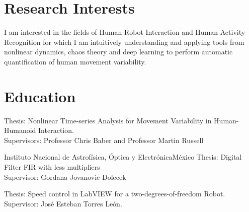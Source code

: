 \documentclass[10pt,a4paper,roman]{moderncv}
\begin{document}
\section{Research Interests}
\begin{changemargin}{2.4cm}{0.5cm}
I am interested in the fields of Human-Robot Interaction and Human Activity Recognition
for which I am intuitively understanding and applying tools from nonlinear dynamics, chaos theory 
and deep learning to perform automatic quantification of human movement variability.
\end{changemargin}


\section{Education}
  {Thesis: Nonlinear Time-series Analysis for Movement Variability in Human-Humanoid Interaction.
  \href{https://github.com/mxochicale/PhD}{\faGithubAlt}
   \\ Supervisors: Professor Chris Baber and  Professor Martin Russell  }

  {Instituto Nacional de Astrof\'isica, \'Optica y Electr\'onica}{M\'exico}{}
  {Thesis: Digital Filter FIR with less multipliers
  \href{https://github.com/mxochicale/publications/blob/master/Thesis/M.Sc./doc/MPXochicale_MScThesis-2016.pdf}{\faFilePdfO}
  \href{https://github.com/mxochicale/publications/tree/master/Thesis/M.Sc.}{\faGithubAlt}
  \\ Supervisor: Gordana Jovanovic Dolecek}

  {Thesis: Speed control in LabVIEW for a two-degrees-of-freedom Robot.
  \href{https://github.com/mxochicale/publications/blob/master/Thesis/B.Eng./doc/MPXochicale_BachelorEngThesis-2003.pdf}{\faFilePdfO}
  \href{https://github.com/mxochicale/publications/tree/master/Thesis/B.Eng.}{\faGithubAlt}
  \\ Supervisor: Jos\'e Esteban Torres Le\'on.}


\end{document}
